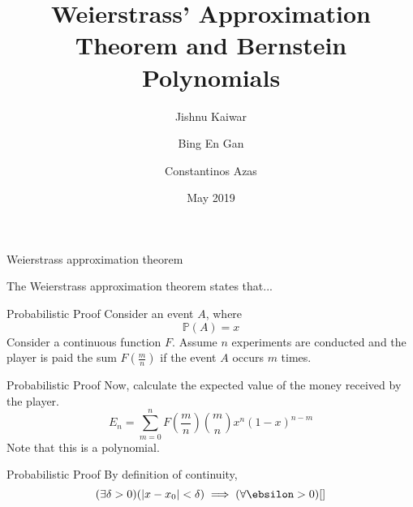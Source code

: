 \documentclass{beamer}
\title{Weierstrass' Approximation Theorem and Bernstein Polynomials}
\author{Jishnu Kaiwar
  \and
  Bing En Gan
  \and
  Constantinos Azas}
\date{May 2019}
\begin{document}
\frame{\titlepage}

\begin{frame}{Weierstrass approximation theorem}
\begin{theorem}
The Weierstrass approximation theorem states that...
\end{theorem}
\end{frame}

\begin{frame}{Probabilistic Proof}
Consider an event $A$, where
$$\mathbb{P}(A)=x$$
Consider a continuous function $F$.
\newline 
Assume $n$ experiments are conducted and the player is paid the sum $F(\frac{m}{n})$ if the event $A$ occurs $m$ times.    
\end{frame}

\begin{frame}{Probabilistic Proof}
Now, calculate the expected value of the money received by the player.
\begin{equation*}
      E_n = \sum_{m=0}^{n} F \left( \frac{m}{n} \right) \binom{m}{n} x^n (1-x)^{n-m}
\end{equation*}
Note that this is a polynomial.
\end{frame}

\begin{frame}{Probabilistic Proof}
By definition of continuity,
\begin{equation*}
    (\exists\delta>0)(|x-x_0|<\delta)\implies(\forall\ebsilon>0)[]
\end{equation*}
\end{frame}
\end{document}
